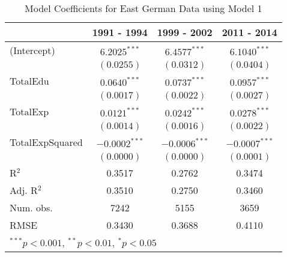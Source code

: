 
\begin{table}
\begin{center}
\begin{tiny}
\begin{tabular}{l c c c }
\hline
 & 1991 - 1994 & 1999 - 2002 & 2011 - 2014 \\
\hline
(Intercept)     & $6.2025^{***}$  & $6.4577^{***}$  & $6.1040^{***}$  \\
                & $(0.0255)$      & $(0.0312)$      & $(0.0404)$      \\
TotalEdu        & $0.0640^{***}$  & $0.0737^{***}$  & $0.0957^{***}$  \\
                & $(0.0017)$      & $(0.0022)$      & $(0.0027)$      \\
TotalExp        & $0.0121^{***}$  & $0.0242^{***}$  & $0.0278^{***}$  \\
                & $(0.0014)$      & $(0.0016)$      & $(0.0022)$      \\
TotalExpSquared & $-0.0002^{***}$ & $-0.0006^{***}$ & $-0.0007^{***}$ \\
                & $(0.0000)$      & $(0.0000)$      & $(0.0001)$      \\
\hline
R$^2$           & 0.3517          & 0.2762          & 0.3474          \\
Adj. R$^2$      & 0.3510          & 0.2750          & 0.3460          \\
Num. obs.       & 7242            & 5155            & 3659            \\
RMSE            & 0.3430          & 0.3688          & 0.4110          \\
\hline
\multicolumn{4}{l}{\tiny{$^{***}p<0.001$, $^{**}p<0.01$, $^*p<0.05$}}
\end{tabular}
\end{tiny}
\caption{Model Coefficients for East German Data using Model 1}
\label{table:EastModelsTotal}
\end{center}
\end{table}
